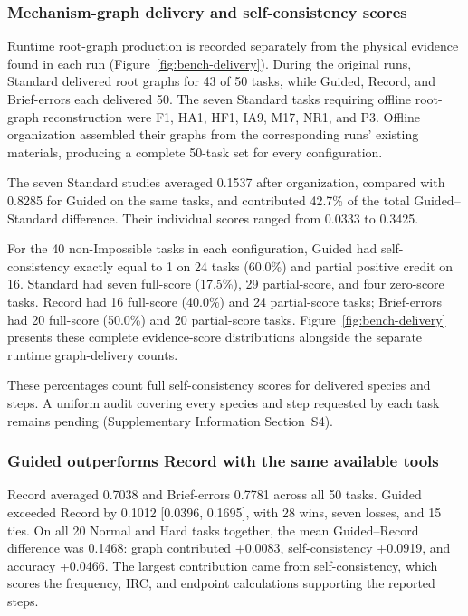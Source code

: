 \subsubsection{Mechanism-graph delivery and self-consistency scores}

Runtime root-graph production is recorded separately from the physical evidence found in each run (Figure~\ref{fig:bench-delivery}). During the original runs, Standard delivered root graphs for 43 of 50 tasks, while Guided, Record, and Brief-errors each delivered 50. The seven Standard tasks requiring offline root-graph reconstruction were F1, HA1, HF1, IA9, M17, NR1, and P3. Offline organization assembled their graphs from the corresponding runs' existing materials, producing a complete 50-task set for every configuration.

The seven Standard studies averaged 0.1537 after organization, compared with 0.8285 for Guided on the same tasks, and contributed 42.7\% of the total Guided--Standard difference. Their individual scores ranged from 0.0333 to 0.3425.

For the 40 non-Impossible tasks in each configuration, Guided had self-consistency exactly equal to 1 on 24 tasks (60.0\%) and partial positive credit on 16. Standard had seven full-score (17.5\%), 29 partial-score, and four zero-score tasks. Record had 16 full-score (40.0\%) and 24 partial-score tasks; Brief-errors had 20 full-score (50.0\%) and 20 partial-score tasks. Figure~\ref{fig:bench-delivery} presents these complete evidence-score distributions alongside the separate runtime graph-delivery counts.

These percentages count full self-consistency scores for delivered species and steps. A uniform audit covering every species and step requested by each task remains pending (Supplementary Information Section~S4).

\subsubsection{Guided outperforms Record with the same available tools}

Record averaged 0.7038 and Brief-errors 0.7781 across all 50 tasks. Guided exceeded Record by 0.1012 [0.0396, 0.1695], with 28 wins, seven losses, and 15 ties. On all 20 Normal and Hard tasks together, the mean Guided--Record difference was 0.1468: graph contributed +0.0083, self-consistency +0.0919, and accuracy +0.0466. The largest contribution came from self-consistency, which scores the frequency, IRC, and endpoint calculations supporting the reported steps.

